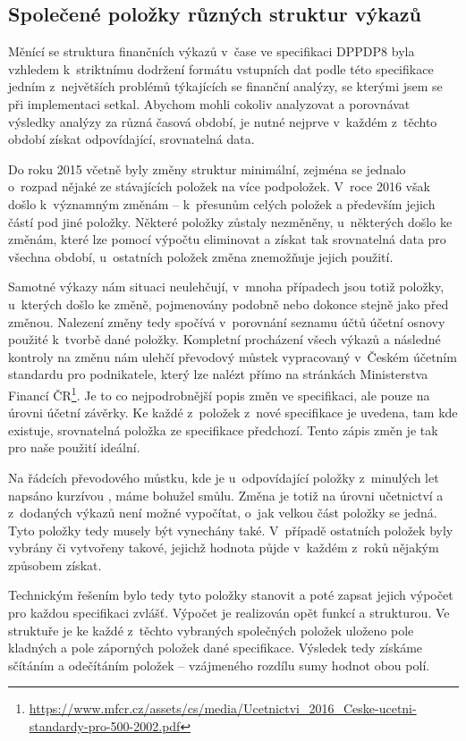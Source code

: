 \subsection{Společené položky různých struktur výkazů}
\label{spol}
Měnící se struktura finančních výkazů v~čase ve specifikaci DPPDP8 byla vzhledem k~striktnímu dodržení formátu vstupních dat podle této specifikace jedním z~největších problémů týkajících se finanční analýzy, se kterými jsem se při implementaci setkal. Abychom mohli cokoliv analyzovat a porovnávat výsledky analýzy za různá časová období, je nutné nejprve v~každém z~těchto období získat odpovídající, srovnatelná data. 

Do roku 2015 včetně byly změny struktur minimální, zejména se jednalo o~rozpad nějaké ze stávajících položek na více podpoložek. V~roce 2016 však došlo k~významným změnám -- k~přesunům celých položek a především jejich částí pod jiné položky. Některé položky zůstaly nezměněny, u~některých došlo ke změnám, které lze pomocí výpočtu eliminovat a získat tak srovnatelná data pro všechna období, u~ostatních položek změna znemožňuje jejich použití. 

Samotné výkazy nám situaci neulehčují, v~mnoha případech jsou totiž položky, u~kterých došlo ke změně, pojmenovány podobně nebo dokonce stejně jako před změnou. Nalezení změny tedy spočívá v~porovnání seznamu účtů účetní osnovy použité k~tvorbě dané položky. Kompletní procházení všech výkazů a následné kontroly na změnu nám ulehčí převodový můstek vypracovaný v~Českém účetním standardu pro podnikatele, který lze nalézt přímo na stránkách Ministerstva Financí ČR\footnote{\url{https://www.mfcr.cz/assets/cs/media/Ucetnictvi\_2016\_Ceske-ucetni-standardy-pro-500-2002.pdf}}. Je to co nejpodrobnější popis změn ve specifikaci, ale pouze na úrovni účetní závěrky. Ke každé z~položek z~nové specifikace je uvedena, tam kde existuje, srovnatelná položka ze specifikace předchozí. Tento zápis změn je tak pro naše použití ideální.

Na řádcích převodového můstku, kde je u~odpovídající položky z~minulých let napsáno kurzívou , máme bohužel smůlu. Změna je totiž na úrovni učetnictví a z~dodaných výkazů není možné vypočítat, o~jak velkou část položky se jedná. Tyto položky tedy musely být vynechány také. V~případě ostatních položek byly vybrány či vytvořeny takové, jejichž hodnota půjde v~každém z~roků nějakým způsobem získat. 

Technickým řešením bylo tedy tyto položky stanovit a poté zapsat jejich výpočet pro každou specifikaci zvlášť. Výpočet je realizován opět funkcí a strukturou. Ve struktuře je ke každé z~těchto vybraných společných položek uloženo pole kladných a pole záporných položek dané specifikace. Výsledek tedy získáme sčítáním a odečítáním položek -- vzájmeného rozdílu sumy hodnot obou polí.

